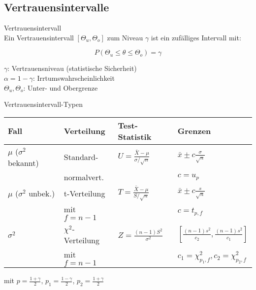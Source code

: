 \subsection{Vertrauensintervalle}

\begin{definition}{Vertrauensintervall}\\
Ein Vertrauensintervall $[\Theta_u,\Theta_o]$ zum Niveau $\gamma$ ist ein zufälliges Intervall mit:

\[P(\Theta_u \leq \theta \leq \Theta_o) = \gamma\]

$\gamma$: Vertrauensniveau (statistische Sicherheit)\\
$\alpha = 1-\gamma$: Irrtumswahrscheinlichkeit\\
$\Theta_u, \Theta_o$: Unter- und Obergrenze
\end{definition}

\begin{concept}{Vertrauensintervall-Typen}\\
\begin{center}
\begin{tabular}{|l|l|l|l|}
\hline
Fall & Verteilung & Test-Statistik & Grenzen \\
\hline
$\mu$ ($\sigma^2$ bekannt) & Standard- & $U = \frac{\bar{X}-\mu}{\sigma/\sqrt{n}}$ & $\bar{x} \pm c\frac{\sigma}{\sqrt{n}}$ \\
& normalvert. & & $c = u_p$ \\
\hline
$\mu$ ($\sigma^2$ unbek.) & t-Verteilung & $T = \frac{\bar{X}-\mu}{S/\sqrt{n}}$ & $\bar{x} \pm c\frac{s}{\sqrt{n}}$ \\
& mit $f=n-1$ & & $c = t_{p,f}$ \\
\hline
$\sigma^2$ & $\chi^2$-Verteilung & $Z = \frac{(n-1)S^2}{\sigma^2}$ & $[\frac{(n-1)s^2}{c_2}, \frac{(n-1)s^2}{c_1}]$ \\
& mit $f=n-1$ & & $c_1 = \chi^2_{p_1,f}, c_2 = \chi^2_{p_2,f}$ \\
\hline
\end{tabular}
\end{center}

mit $p = \frac{1+\gamma}{2}$, $p_1 = \frac{1-\gamma}{2}$, $p_2 = \frac{1+\gamma}{2}$
\end{concept}

